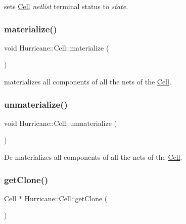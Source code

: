 sets \mbox{\hyperlink{classHurricane_1_1Cell}{Cell}} {\itshape netlist} terminal status to {\itshape state}. \mbox{\label{classHurricane_1_1Cell_affefc597317063857f4904d4b16d5d4f}} 
\subsubsection{\texorpdfstring{materialize()}{materialize()}}
{\footnotesize\ttfamily void Hurricane\+::\+Cell\+::materialize (\begin{DoxyParamCaption}{ }\end{DoxyParamCaption})}

materializes all components of all the nets of the \mbox{\hyperlink{classHurricane_1_1Cell}{Cell}}. \mbox{\label{classHurricane_1_1Cell_a40c9ba4e3fc76b0c4bc58af8dcaddf53}} 
\subsubsection{\texorpdfstring{unmaterialize()}{unmaterialize()}}
{\footnotesize\ttfamily void Hurricane\+::\+Cell\+::unmaterialize (\begin{DoxyParamCaption}{ }\end{DoxyParamCaption})}

De-\/materializes all components of all the nets of the \mbox{\hyperlink{classHurricane_1_1Cell}{Cell}}. \mbox{\label{classHurricane_1_1Cell_a092f53c7f517ecc70d9ba375296c5d5b}} 
\subsubsection{\texorpdfstring{get\+Clone()}{getClone()}}
{\footnotesize\ttfamily \mbox{\hyperlink{classHurricane_1_1Cell}{Cell}} $\ast$ Hurricane\+::\+Cell\+::get\+Clone (\begin{DoxyParamCaption}{ }\end{DoxyParamCaption})}

